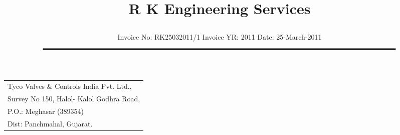 \documentclass[11pt]{article}
\title{\vspace*{-1.5cm} \centerline{ \Huge \bf \hspace{0cm} R K Engineering Services}\vspace*{-0.75cm}}
\author{%
 \scriptsize Invoice No: RK25032011/1  \hspace*{4cm}  Invoice YR: 2011 \hspace*{4cm} Date: 25-March-2011\\
$\rule{7.0in}{0.5mm}$}
\date{}
\begin{document}
\maketitle
\thispagestyle{empty}
\vspace*{0.5cm}	
\begin{flushleft}
{\footnotesize
\begin{tabular}{l}
Tyco Valves \& Controls India Pvt. Ltd.,\\
Survey No 150, Halol- Kalol Godhra Road,\\
P.O.:  Meghasar (389354)\\
Dist: Panchmahal, Gujarat.\\
\end{tabular}
}
\end{flushleft}

\vspace*{1cm}

\vspace*{0.5cm}

\end{document}
